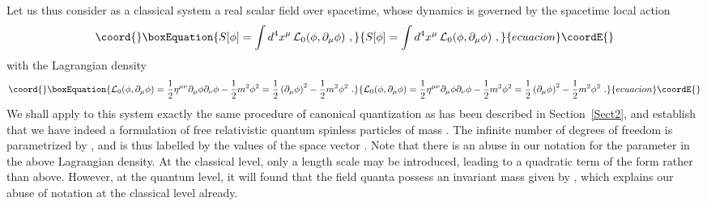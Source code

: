 \documentclass[a4paper,11pt]{article}
\begin{document}
Let us thus consider as a classical system a real scalar field \coordHE{} 
over spacetime, whose dynamics is governed by the spacetime local action
\begin{equation}\coord{}\boxEquation{
S[\phi]=\int d^4x^\mu\,{\cal L}_0(\phi,\partial_\mu\phi)\ ,
}{
S[\phi]=\int d^4x^\mu\,{\cal L}_0(\phi,\partial_\mu\phi)\ ,
}{ecuacion}\coordE{}\end{equation}
with the Lagrangian density
\begin{equation}\coord{}\boxEquation{
{\cal L}_0(\phi,\partial_\mu\phi)=
\frac{1}{2}\eta^{\mu\nu}\partial_\mu\phi\partial_\nu\phi-\frac{1}{2}m^2\phi^2=
\frac{1}{2}\left(\partial_\mu\phi\right)^2- \frac{1}{2}m^2\phi^2\ .
}{
{\cal L}_0(\phi,\partial_\mu\phi)=
\frac{1}{2}\eta^{\mu\nu}\partial_\mu\phi\partial_\nu\phi-\frac{1}{2}m^2\phi^2=
\frac{1}{2}\left(\partial_\mu\phi\right)^2- \frac{1}{2}m^2\phi^2\ .
}{ecuacion}\coordE{}\end{equation}
We shall apply to this system exactly the same procedure of canonical
quantization as has been described in Section~\ref{Sect2}, and establish that
we have indeed a formulation of free relativistic quantum spinless
particles of mass \coordHE{}. The infinite number of degrees of freedom is 
parametrized by \coordHE{}, and is thus labelled by the values 
of the space vector \coordHE{}. Note that there is an abuse
in our notation for the parameter \coordHE{} in the above Lagrangian density.
At the classical level, only a length scale \myHighlight{$\kappa$}\coordHE{} may be introduced,
leading to a quadratic term of the form \coordHE{} rather than
\coordHE{} above. However, at the quantum level, it will found that
the field quanta possess an invariant mass given by \coordHE{},
which explains our abuse of notation at the classical level already.
\end{document}
